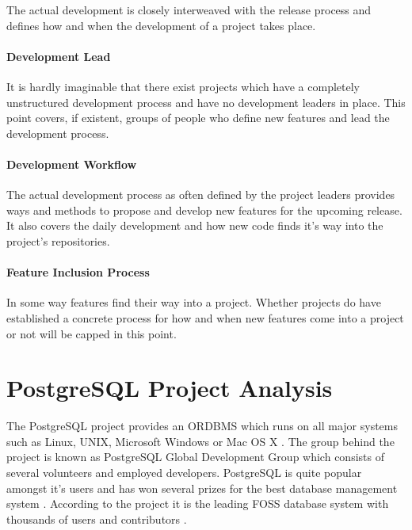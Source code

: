 The actual development is closely interweaved with the release process and
defines how and when the development of a project takes place.

\paragraph{Development Lead}

It is hardly imaginable that there exist projects which have a completely
unstructured development process and have no development leaders in place. This
point covers, if existent, groups of people who define new features and lead
the development process.

\paragraph{Development Workflow}

The actual development process as often defined by the project leaders provides
ways and methods to propose and develop new features for the upcoming release.
It also covers the daily development and how new code finds it's way into the
project's repositories.

\paragraph{Feature Inclusion Process}

In some way features find their way into a project. Whether projects do have
established a concrete process for how and when new features come into a
project or not will be capped in this point.


\cleardoublepage

\section{PostgreSQL Project Analysis} %


The PostgreSQL project provides an \ac{ORDBMS} which runs on all major systems
such as Linux, UNIX, Microsoft Windows or Mac OS X
\cite{PostgreSQLAbout,PostgreSQLFAQ}. The group behind the project is known as
PostgreSQL Global Development Group which consists of several volunteers and
employed developers. PostgreSQL is quite popular amongst it's users and has won
several prizes for the best database management system \cite{PostgreSQLAwards}.
According to the project it is the leading \ac{FOSS} database system with
thousands of users and contributors \cite{PostgreSQLPressKit}.

